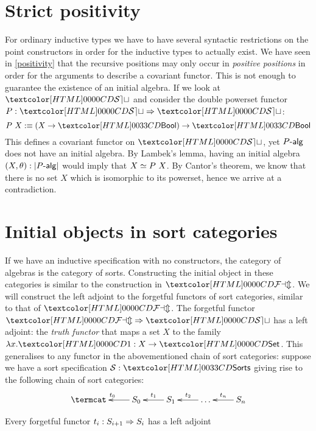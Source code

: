 \section{Strict positivity}

For ordinary inductive types we have to have several syntactic
restrictions on the point constructors in order for the inductive
types to actually exist. We have seen in
\cref{positivity} that the recursive positions may only
occur in \emph{positive positions} in order for the arguments to
describe a covariant functor. This is not enough to guarantee the
existence of an initial algebra. If we look at $\SET$ and consider the
double powerset functor $P : \Func{\SET}{\SET}$:
$$
P\ X \ddefeq (X \to \boolty) \to \boolty
$$
This defines a covariant functor on $\SET$, yet $\algcat{P}$ does not
have an initial algebra. By Lambek's lemma, having an initial algebra
$(X,\theta) : | \algcat{P} |$ would imply that $X \simeq P\ X$. By
Cantor's theorem, we know that there is no set $X$ which is isomorphic
to its powerset, hence we arrive at a contradiction.

\section{Initial objects in sort categories}

If we have an inductive specification with no constructors, the
category of algebras is the category of sorts. Constructing the
initial object in these categories is similar to the construction in
$\FAM$. We will construct the left adjoint to the forgetful functors
of sort categories, similar to that of $\FAM$. The forgetful functor
$\Func{\FAM}{\SET}$ has a left adjoint: the \emph{truth functor} that
maps a set $X$ to the family $\lambda x . \unitty : X \to \Set$. This
generalises to any functor in the abovementioned chain of sort
categories: suppose we have a sort specification $\Ss : \sortsty$
giving rise to the following chain of sort categories:
$$
\xymatrix{
\termcat &S_0 \ar[l]_{t_0} &S_1 \ar[l]_{t_1} &\hdots \ar[l]_{t_2} &S_n \ar[l]_{t_n}
}
$$

\begin{proposition}
  \label{every-sort-adjoint-to-first-sort}
  Every forgetful functor $t_i : S_{i+1} \Rightarrow S_i$ has a left adjoint
\end{proposition}

